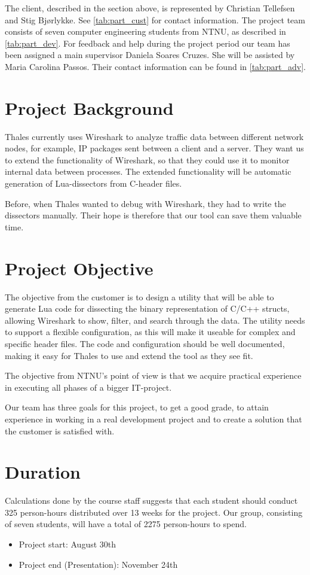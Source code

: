The client, described in the section above, is represented by Christian Tellefsen and Stig Bjørlykke. See \ref{tab:part_cust} for contact information.
The project team consists of seven computer engineering students from NTNU, as described in \ref{tab:part_dev}.
For feedback and help during the project period our team has been assigned a main supervisor Daniela Soares Cruzes.
She will be assisted by Maria Carolina Passos. Their contact information can be found in \ref{tab:part_adv}.

\section{Project Background}
Thales currently uses Wireshark to analyze traffic data between different network nodes, for example, IP packages sent between a client and a server.
They want us to extend the functionality of Wireshark, so that they could use it to monitor internal data between processes. The extended functionality will be automatic generation of Lua-dissectors from C-header files.

Before, when Thales wanted to debug with Wireshark, they had to write the dissectors manually. Their hope is therefore that our tool can save them valuable time.

\section{Project Objective}
The objective from the customer is to design a utility that will be able to generate Lua code for dissecting the binary representation of C/C++ structs, allowing Wireshark to show, filter, and search through the data. The utility needs to support a flexible configuration, as this will make it useable for complex and specific header files. 
The code and configuration should be well documented, making it easy for Thales to use and extend the tool as they see fit.

The objective from NTNU's point of view is that we acquire practical experience in executing all phases of a bigger IT-project.

Our team has three goals for this project, to get a good grade, to attain experience in working in a real development project and to create a solution that the customer
is satisfied with.

\section{Duration}
Calculations done by the course staff suggests that each student should conduct 325 person-hours distributed over 13 weeks for the project. Our group, consisting of seven students, will have a total of 2275 person-hours to spend.\\
\begin {itemize}
	\item Project start: August 30th
	\item Project end (Presentation): November 24th
\end{itemize}

